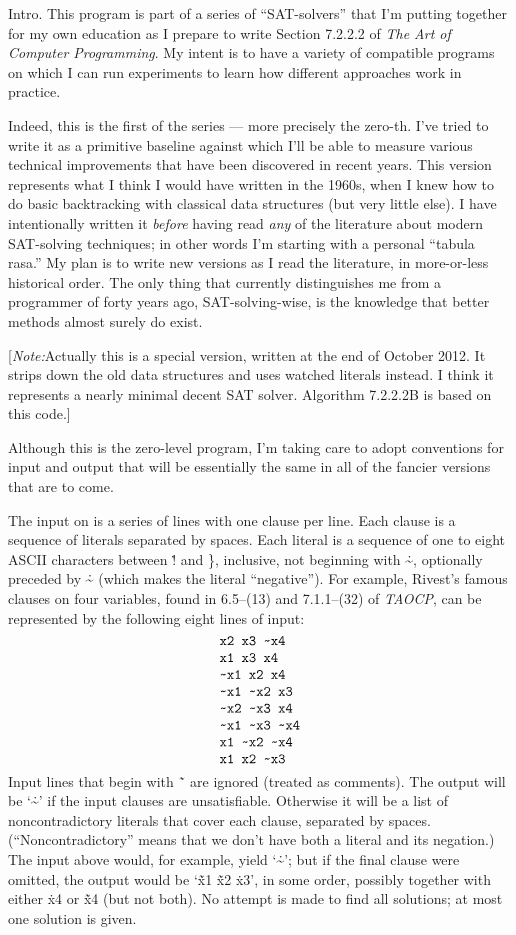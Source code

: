 
\srcloctrue
\datethis

Intro. This program is part of a series of ``SAT-solvers''
that I'm putting
together for my own education as I prepare to write Section 7.2.2.2 of
{\sl The Art of Computer Programming}. My intent is to have a variety of
compatible programs on which I can run experiments to learn how different
approaches work in practice.

Indeed, this is the first of the series --- more precisely the zero-th. I've
tried to write it as a primitive baseline against which I'll be able to measure
various technical improvements that have been discovered in recent years.
This version represents what I think I would have written in the 1960s,
when I knew how to do basic backtracking with classical data structures
(but very little else). I have intentionally written it {\it before\/} having
read {\it any\/} of the literature about modern SAT-solving techniques;
in other words I'm starting with a personal ``tabula rasa.''
My plan is to write new versions as I read the literature, in more-or-less
historical order. The only thing that currently distinguishes me from a
programmer of forty years ago, SAT-solving-wise, is the knowledge that better
methods almost surely do exist.

[{\it Note:}\enspace Actually this is a special version, written
at the end of October 2012. It strips down the old data structures
and uses watched literals instead. I think it represents a nearly
minimal decent {\mc SAT} solver. Algorithm 7.2.2.2B is based on this code.]

Although this is the zero-level program, I'm taking care to adopt conventions
for input and output that will be essentially the same in all of the
fancier versions that are to come.

The input on  is a series of lines with one clause per line. Each
clause is a sequence of literals separated by spaces. Each literal is
a sequence of one to eight ASCII characters between \.{!} and \.{\}},
inclusive, not beginning with \.{\~},
optionally preceded by \.{\~} (which makes the literal ``negative'').
For example, Rivest's famous clauses on four variables,
found in 6.5--(13) and 7.1.1--(32) of {\sl TAOCP}, can be represented by the
following eight lines of input:
$$\chardef~=`\~
\vcenter{\halign{\tt#\cr
x2 x3 ~x4\cr
x1 x3 x4\cr
~x1 x2 x4\cr
~x1 ~x2 x3\cr
~x2 ~x3 x4\cr
~x1 ~x3 ~x4\cr
x1 ~x2 ~x4\cr
x1 x2 ~x3\cr}}$$
Input lines that begin with \.{\~\ } are ignored (treated as comments).
The output will be `\.{\~}' if the input clauses are unsatisfiable.
Otherwise it will be a list of noncontradictory literals that cover each
clause, separated by spaces. (``Noncontradictory'' means that we don't
have both a literal and its negation.) The input above would, for example,
yield `\.{\~}'; but if the final clause were omitted, the output would
be `\.{\~x1} \.{\~x2} \.{x3}', in some order, possibly together
with either \.{x4} or \.{\~x4} (but not both). No attempt is made to
find all solutions; at most one solution is given.

